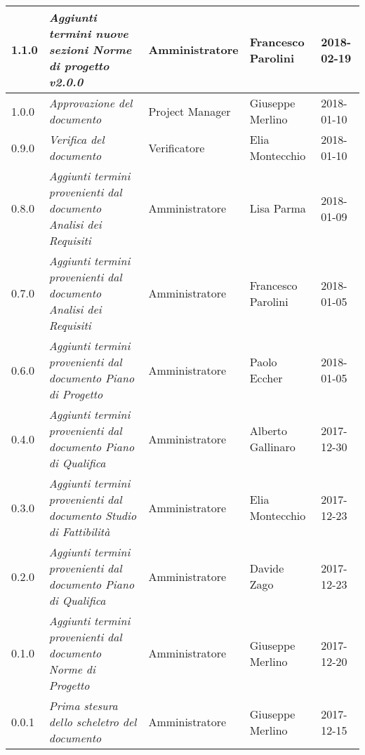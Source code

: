 \begin{table}[H]
\begin{tabular}{C{2cm}|C{4cm}|C{3cm}|C{3cm}|R{2cm}}
		1.1.0 & \emph{Aggiunti termini nuove sezioni Norme di progetto v2.0.0} & Amministratore & Francesco Parolini & 2018-02-19  \\
		\hline
		
		1.0.0 & \emph{Approvazione del documento} & Project Manager & Giuseppe Merlino & 2018-01-10  \\
		\hline
		
		0.9.0 & \emph{Verifica del documento} & Verificatore & Elia Montecchio  & 2018-01-10 \\
		\hline
		
		0.8.0 & \emph{Aggiunti termini provenienti dal documento Analisi dei Requisiti} & Amministratore  & Lisa Parma & 2018-01-09 \\
		\hline
		
		0.7.0 & \emph{Aggiunti termini provenienti dal documento Analisi dei Requisiti} & Amministratore & Francesco Parolini & 2018-01-05 \\
		\hline
		
		0.6.0 & \emph{Aggiunti termini provenienti dal documento Piano di Progetto} & Amministratore & Paolo Eccher & 2018-01-05  \\
		\hline
		
		0.4.0 & \emph{Aggiunti termini provenienti dal documento Piano di Qualifica} & Amministratore & Alberto Gallinaro & 2017-12-30 \\
		\hline
		
		0.3.0 & \emph{Aggiunti termini provenienti dal documento Studio di Fattibilità} & Amministratore & Elia Montecchio & 2017-12-23 \\
		\hline
		
		0.2.0 & \emph{Aggiunti termini provenienti dal documento Piano di Qualifica}  & Amministratore & Davide Zago & 2017-12-23 \\
		\hline
		
		0.1.0 & \emph{Aggiunti termini provenienti dal documento Norme di Progetto}  & Amministratore & Giuseppe Merlino & 2017-12-20 \\
		\hline
		
		0.0.1 & \emph{Prima stesura dello scheletro del documento} & Amministratore  & Giuseppe Merlino & 2017-12-15   \\
		
	\end{tabular}
	
\end{table}


\clearpage